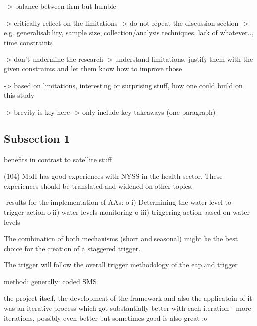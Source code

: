 --> balance between firm but humble

->  critically reflect on the limitations 
-> do not repeat the discussion section
-> e.g. generalisability, sample size, collection/analysis techniques, lack of whatever.., time constraints

-> don't undermine the research
-> understand limitations, justify them with the given constraints and let them know how to improve those

-> based on limitations, interesting or surprising stuff, how one could build on this study


-> brevity is key here -> only include key takeaways (one paragraph)

\subsection{Subsection 1}

benefits in contrast to satellite stuff

(104) MoH has good experiences with NYSS in the health sector. These experiences should be translated and widened on other topics.



-results for the implementation of AAs:
o	i) Determining the water level to trigger action
o	ii) water levels monitoring
o	iii) triggering action based on water levels


The combination of both mechanisms (short and seasonal) might be the best choice for the creation of a staggered trigger.


The trigger will follow the overall trigger methodology of the \acrshort{eap} and 
trigger

method: generally: coded SMS



the project itself, the development of the framework and also the applicatoin of it was an iterative process which got substantially better with each iteration - more iterations, possibly even better but sometimes good is also great :o





